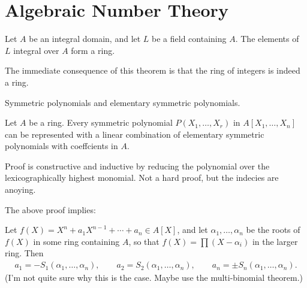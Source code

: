 \part{Algebraic Number Theory}

\begin{thmbox}
    \begin{theorem}
        Let \(A\) be an integral domain, and let \(L\) be a field containing \(A\). The elements of \(L\) integral over \(A\) form a ring.
    \end{theorem}
\end{thmbox}
\begin{remark}
    The immediate consequence of this theorem is that the ring of integers is indeed a ring.
\end{remark}
\begin{defbox}
    \begin{definition}
        Symmetric polynomials and elementary symmetric polynomials.
    \end{definition}
\end{defbox}
\begin{thmbox}
    \begin{theorem}
        Let \(A\) be a ring. Every symmetric polynomial \(P(X_1, \ldots, X_r)\) in \(A[X_1, \ldots, X_n]\) can be represented with a linear combination of elementary symmetric polynomials with coeffcients in \(A\).
    \end{theorem}
\end{thmbox}
Proof is constructive and inductive by reducing the polynomial over the lexicographically highest monomial. Not a hard proof, but the indecies are anoying.

The above proof implies:

Let \(f(X) = X^n + a_1 X^{n-1} + \cdots + a_n \in A[X]\), and let \(\alpha_1, \ldots, \alpha_n\) be the roots of \(f(X)\) in some ring containing \(A\), so that \(f(X) = \prod (X - \alpha_i)\) in the larger ring. Then
\begin{align*}
    a_1 = -S_1(\alpha_1, \ldots, \alpha_n), \qquad a_2 = S_2(\alpha_1, \ldots, \alpha_n), \qquad a_n = \pm S_n(\alpha_1, \ldots, \alpha_n) \text{.}
\end{align*}
(I'm not quite sure why this is the case. Maybe use the multi-binomial theorem.)

